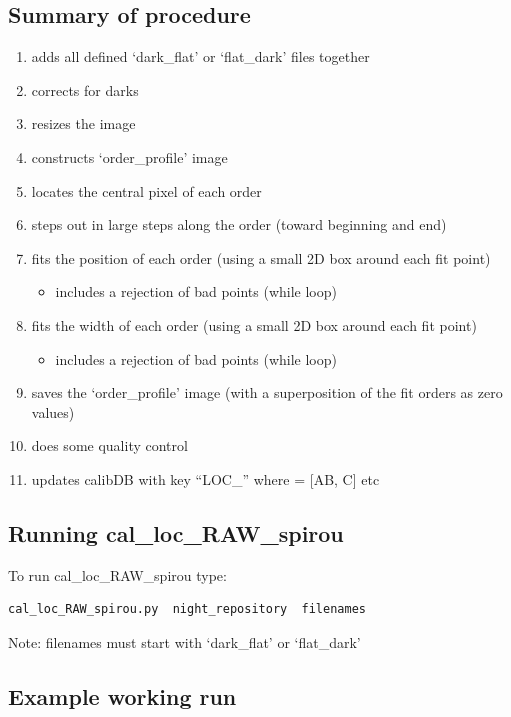 \subsection{Summary of procedure}
\begin{enumerate}
\item adds all defined `dark\_flat' or `flat\_dark' files together
\item corrects for darks
\item resizes the image
\item constructs `order\_profile' image
\item locates the central pixel of each order
\item steps out in large steps along the order (toward beginning and end)
\item fits the position of each order (using a small 2D box around each fit point)
	\begin{itemize}
	\item includes a rejection of bad points (while loop)
	\end{itemize}
\item fits the width of each order (using a small 2D box around each fit point)
	\begin{itemize}
	\item includes a rejection of bad points (while loop)
	\end{itemize}
\item saves the `order\_profile' image (with a superposition of the fit orders as zero values)
\item does some quality control
\item updates calibDB with key ``LOC\_'' where  = [AB, C] etc
\end{enumerate}

\subsection{Running cal\_loc\_RAW\_spirou}

To run cal\_loc\_RAW\_spirou type:
\begin{lstlisting}[language=bash, style=bashstyle]
cal_loc_RAW_spirou.py  night_repository  filenames
\end{lstlisting}

\noindent Note: filenames must start with `dark\_flat' or `flat\_dark'

\subsection{Example working run}


